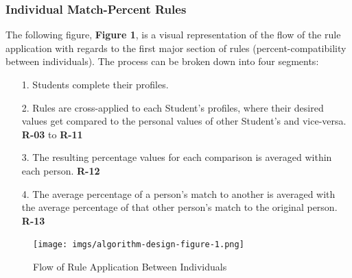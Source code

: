 \documentclass[12pt,letterpaper]{article}
\begin{document}
\subsubsection*{Individual Match-Percent Rules}
The following figure, {\bf Figure 1},  is a visual representation of the flow of the rule application with regards to the first major section of rules (percent-compatibility between individuals). The process can be broken down into four segments:
\begin{enumerate}
	\item[1.] Students complete their profiles.
	\item[2.] Rules are cross-applied to each Student's profiles, where their desired values get compared to the personal values of other Student's and vice-versa. {\bf R-03} to {\bf R-11}
	\item[3.] The resulting percentage values for each comparison is averaged within each person. {\bf R-12}
	\item[4.] The average percentage of a person's match to another is averaged with the average percentage of that other person's match to the original person. {\bf R-13}
\end{enumerate}

\begin{figure}[H]
	\caption{Flow of Rule Application Between Individuals}
	\begin{center}
		\texttt{[image: imgs/algorithm-design-figure-1.png]}
	\end{center}
\end{figure}
\end{document}
